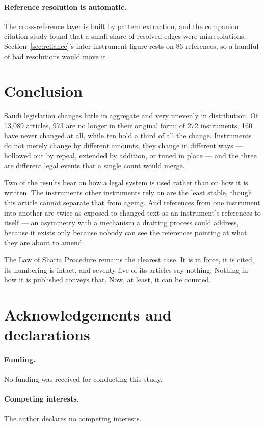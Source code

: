 \documentclass[11pt]{article}
\begin{document}
\paragraph{Reference resolution is automatic.} The cross-reference layer is
built by pattern extraction, and the companion citation study found that a
small share of resolved edges were misresolutions. Section~\ref{sec:reliance}'s
inter-instrument figure rests on 86 references, so a handful of bad
resolutions would move it.

\section{Conclusion}

Saudi legislation changes little in aggregate and very unevenly in
distribution. Of 13,089 articles, 973 are no longer in their original form; of
272 instruments, 160 have never changed at all, while ten hold a third of all
the change. Instruments do not merely change by different amounts, they change
in different ways --- hollowed out by repeal, extended by addition, or tuned in
place --- and the three are different legal events that a single count would
merge.

Two of the results bear on how a legal system is used rather than on how it is
written. The instruments other instruments rely on are the least stable, though
this article cannot separate that from ageing. And references from one
instrument into another are twice as exposed to changed text as an
instrument's references to itself --- an asymmetry with a mechanism a drafting
process could address, because it exists only because nobody can see the
references pointing at what they are about to amend.

The Law of Sharia Procedure remains the clearest case. It is in force, it is
cited, its numbering is intact, and seventy-five of its articles say nothing.
Nothing in how it is published conveys that. Now, at least, it can be counted.


\section*{Acknowledgements and declarations}

\paragraph{Funding.} No funding was received for conducting this study.

\paragraph{Competing interests.} The author declares no competing interests.
\end{document}
